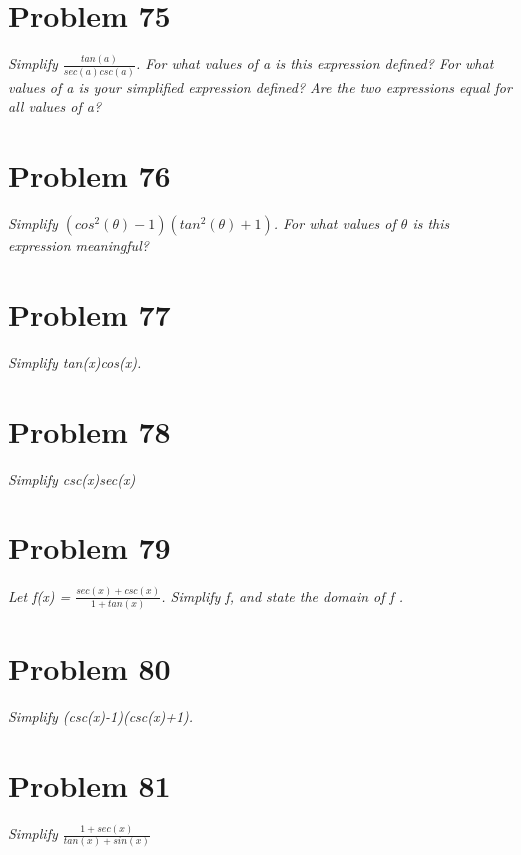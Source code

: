 \documentclass[11pt]{article} %
\begin{document}
\section* {Problem 75}
\textit{Simplify $\frac{tan(a)}{sec(a) csc(a)}$. For what values of a is this expression defined? For what values of a is your simplified expression defined? Are the two expressions equal for all values of a?}

\newpage

\section*{Problem 76}
\textit{Simplify $(cos^{2}(\theta)-1)(tan^{2}(\theta)+1)$. For what values of $\theta$ is this expression meaningful?}

\newpage
\section*{Problem 77}
\textit{Simplify tan(x)cos(x).}
\newpage
\section*{Problem 78}
\textit{Simplify csc(x)sec(x) }
\newpage
\section*{Problem 79} 
\textit{Let f(x) = $\frac{sec(x)+csc(x)}{1+tan(x)}$. Simplify f, and state the domain of f .}
\newpage \section*{Problem 80}
\textit{Simplify (csc(x)-1)(csc(x)+1).}
\newpage
\section*{Problem 81}
\textit{Simplify $\frac{1+sec(x)}{tan(x)+sin(x)}$}
\end{document}

